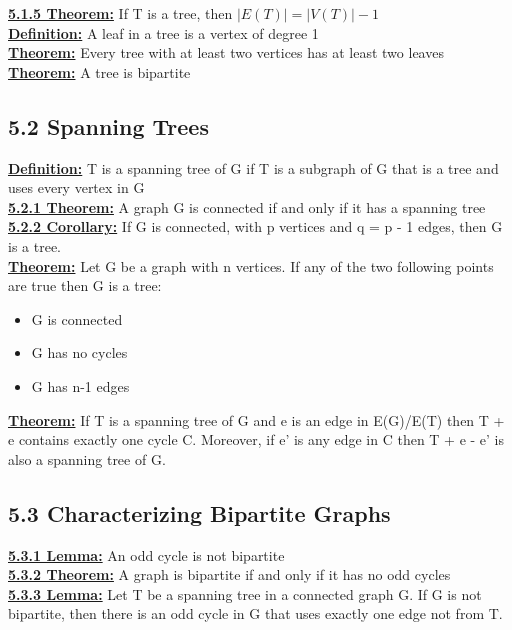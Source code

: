 \documentclass[12pt]{article}
\newcommand{\myt}[1]{\textbf{\underline{#1}}}
\begin{document}
	\myt{5.1.5 Theorem:} If T is a tree, then $|E(T)| = |V(T)| - 1$\\
	
	\myt{Definition:} A leaf in a tree is a vertex of degree 1\\
	\myt{Theorem:} Every tree with at least two vertices has at least two leaves\\
	
	\myt{Theorem:} A tree is bipartite\\
	
	\subsection*{5.2 Spanning Trees}
	\myt{Definition:} T is a spanning tree of G if T is a subgraph of G that is a tree and uses every vertex in G\\
	
	\myt{5.2.1 Theorem:} A graph G is connected if and only if it has a spanning tree\\
	
	\myt{5.2.2 Corollary:} If G is connected, with p vertices and q = p - 1 edges, then G is a tree.\\
	
	\myt{Theorem:} Let G be a graph with n vertices. If any of the two following points are true then G is a tree:\\
	\begin{itemize}
		\item G is connected
		\item G has no cycles
		\item G has n-1 edges
	\end{itemize}
	
	\myt{Theorem:} If T is a spanning tree of G and e is an edge in E(G)/E(T) then T + e  contains exactly one cycle C. Moreover, if e' is any edge in C then T + e - e' is also a spanning tree of G.\\
	
	\subsection*{5.3 Characterizing Bipartite Graphs}
	\myt{5.3.1 Lemma:} An odd cycle is not bipartite\\
	
	\myt{5.3.2 Theorem:} A graph is bipartite if and only if it has no odd cycles\\
	
	\myt{5.3.3 Lemma:} Let T be a spanning tree in a connected graph G. If G is not bipartite, then there is an odd cycle in G that uses exactly one edge not from T.\\
	
\end{document}
